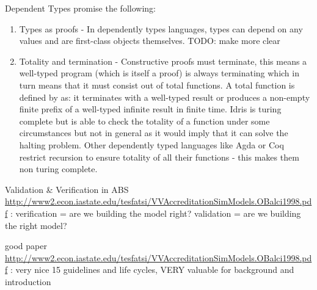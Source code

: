 Dependent Types promise the following:

\begin{enumerate}
	\item Types as proofs - In dependently types languages, types can depend on any values and are first-class objects themselves. TODO: make more clear

	\item Totality and termination - Constructive proofs must terminate, this means a well-typed program (which is itself a proof) is always terminating which in turn means that it must consist out of total functions. A total function is defined by \cite{brady_type-driven_2017} as: it terminates with a well-typed result or produces a non-empty finite prefix of a well-typed infinite result in finite time. Idris is turing complete but is able to check the totality of a function under some circumstances but not in general as it would imply that it can solve the halting problem. Other dependently typed languages like Agda or Coq restrict recursion to ensure totality of all their functions - this makes them non turing complete.
\end{enumerate}



Validation \& Verification in ABS
\url{http://www2.econ.iastate.edu/tesfatsi/VVAccreditationSimModels.OBalci1998.pdf} : verification = are we building the model right? validation = are we building the right model?

good paper \url{http://www2.econ.iastate.edu/tesfatsi/VVAccreditationSimModels.OBalci1998.pdf} : very nice 15 guidelines and life cycles, VERY valuable for background and introduction

